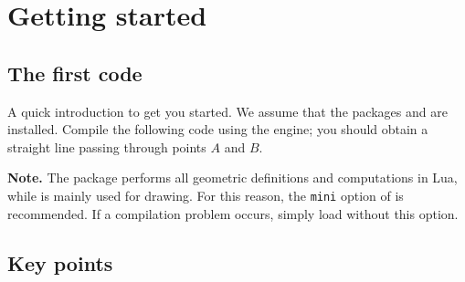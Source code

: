 \section{Getting started}

\subsection{The first code}

A quick introduction to get you started.
We assume that the packages  and  are installed.
Compile the following code using the  engine; you should obtain a straight line
passing through points $A$ and $B$.

\medskip
\noindent
\textbf{Note.}
The package  performs all geometric definitions and computations in Lua,
while  is mainly used for drawing.
For this reason, the \texttt{mini} option of  is recommended.
If a compilation problem occurs, simply load  without this option.


\begin{mybox}{}
\begin{minipage}{.55\textwidth}
\end{minipage}
\begin{minipage}{.35\textwidth}
\end{minipage}
\end{mybox}

\subsection{Key points}

